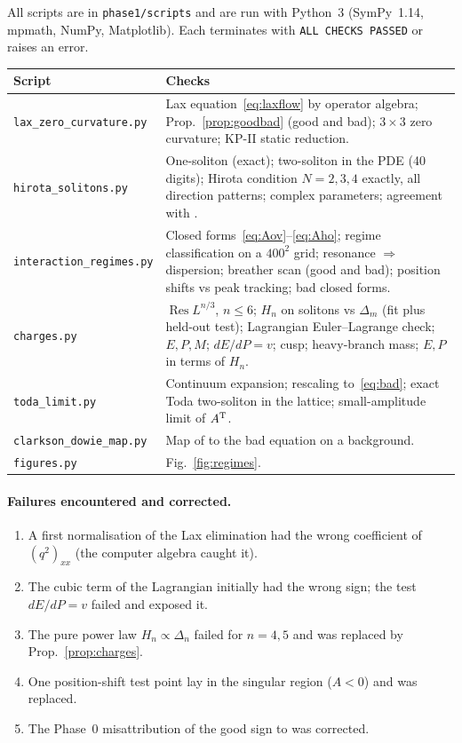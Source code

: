 \documentclass[11pt,a4paper]{article}
\newcommand{\Res}{\operatorname{Res}}
\theoremstyle{remark}
\begin{document}
All scripts are in \texttt{phase1/scripts} and are run with Python~3 (SymPy~1.14, mpmath, NumPy, Matplotlib). Each terminates with \texttt{ALL CHECKS PASSED} or raises an error.

\begin{center}\small
\begin{tabular}{@{}p{4.3cm}p{10.7cm}@{}}
\toprule
Script & Checks\\\midrule
\texttt{lax\_zero\_curvature.py} & Lax equation~\eqref{eq:laxflow} by operator algebra; Prop.~\ref{prop:goodbad} (good and bad); $3\times3$ zero curvature; KP-II static reduction.\\
\texttt{hirota\_solitons.py} & One-soliton (exact); two-soliton in the PDE (40 digits); Hirota condition $N=2,3,4$ exactly, all direction patterns; complex parameters; agreement with \cite[(16)]{BD}.\\
\texttt{interaction\_regimes.py} & Closed forms~\eqref{eq:Aov}--\eqref{eq:Aho}; regime classification on a $400^2$ grid; resonance $\Rightarrow$ dispersion; breather scan (good and bad); position shifts vs peak tracking; bad closed forms.\\
\texttt{charges.py} & $\Res L^{n/3}$, $n\le6$; $H_n$ on solitons vs $\Delta_m$ (fit plus held-out test); Lagrangian Euler--Lagrange check; $E,P,M$; $dE/dP=v$; cusp; heavy-branch mass; $E,P$ in terms of $H_n$.\\
\texttt{toda\_limit.py} & Continuum expansion; rescaling to~\eqref{eq:bad}; exact Toda two-soliton in the lattice; small-amplitude limit of $A^{\rm T}$.\\
\texttt{clarkson\_dowie\_map.py} & Map of \cite[(1.2)]{CD} to the bad equation on a background.\\
\texttt{figures.py} & Fig.~\ref{fig:regimes}.\\
\bottomrule
\end{tabular}
\end{center}

\paragraph{Failures encountered and corrected.}
\begin{enumerate}
\item A first normalisation of the Lax elimination had the wrong coefficient of $(q^2)_{xx}$ (the computer algebra caught it).
\item The cubic term of the Lagrangian initially had the wrong sign; the test $dE/dP=v$ failed and exposed it.
\item The pure power law $H_n\propto\Delta_n$ failed for $n=4,5$ and was replaced by Prop.~\ref{prop:charges}.
\item One position-shift test point lay in the singular region ($A<0$) and was replaced.
\item The Phase~0 misattribution of the good sign to \cite{CL-SOL,CL-SR} was corrected.
\end{enumerate}
\end{document}
